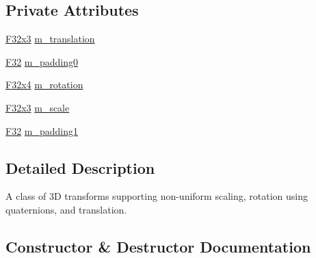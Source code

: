 \subsection*{Private Attributes}
\begin{DoxyCompactItemize}
\item 
\mbox{\hyperlink{namespacemage_a1e3c7a882af461f161caa1cbddaf1fa2}{F32x3}} \mbox{\hyperlink{classmage_1_1_s_q_t_transform3_d_a41257624928becdfdec6284e75eb8605}{m\+\_\+translation}}
\item 
\mbox{\hyperlink{namespacemage_aa97e833b45f06d60a0a9c4fc22ae02c0}{F32}} \mbox{\hyperlink{classmage_1_1_s_q_t_transform3_d_a12fd544ab7fe5e30fee85948bd3e6eac}{m\+\_\+padding0}}
\item 
\mbox{\hyperlink{namespacemage_a851648f37dfb126a2d2f973e102861ad}{F32x4}} \mbox{\hyperlink{classmage_1_1_s_q_t_transform3_d_a06b518d122471db76e721216d3a3ecea}{m\+\_\+rotation}}
\item 
\mbox{\hyperlink{namespacemage_a1e3c7a882af461f161caa1cbddaf1fa2}{F32x3}} \mbox{\hyperlink{classmage_1_1_s_q_t_transform3_d_a7bf284ec5bd7738804f9e2018909280e}{m\+\_\+scale}}
\item 
\mbox{\hyperlink{namespacemage_aa97e833b45f06d60a0a9c4fc22ae02c0}{F32}} \mbox{\hyperlink{classmage_1_1_s_q_t_transform3_d_ac0a31b128eec13e9d4e40fae371e3f83}{m\+\_\+padding1}}
\end{DoxyCompactItemize}


\subsection{Detailed Description}
A class of 3D transforms supporting non-\/uniform scaling, rotation using quaternions, and translation. 

\subsection{Constructor \& Destructor Documentation}
\mbox{\label{classmage_1_1_s_q_t_transform3_d_a1dc66952cc899118d0b911526517849e}} 

